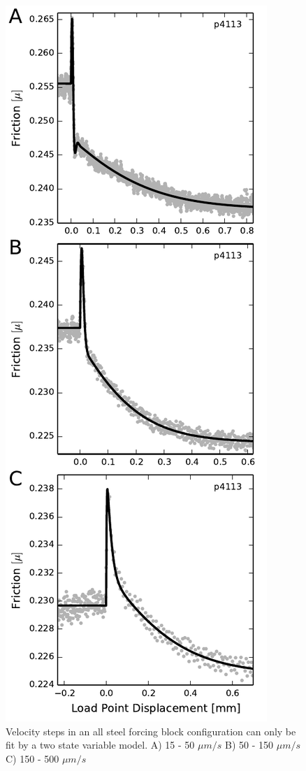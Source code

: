 \begin{figure}
\begin{center}
\includegraphics{chap_granular_stiffness/Fig8.pdf}
\caption{\label{fig:model_fits}
Velocity steps in an all steel forcing block configuration can only be fit by a two state variable model.  A) 15 - 50 $\mu m/s$ B) 50 - 150 $\mu m/s$ C) 150 - 500 $\mu m/s$}
\end{center}
\end{figure}


